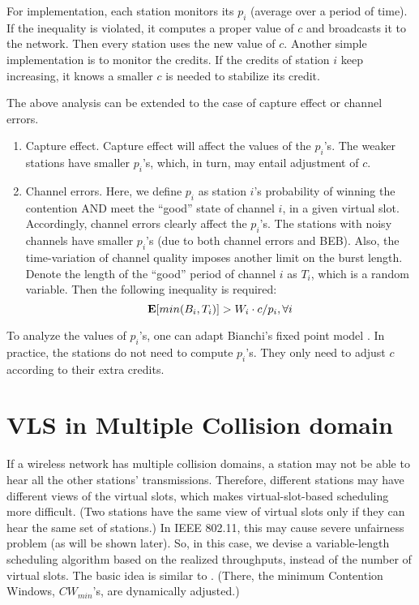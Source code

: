 \documentclass[letterpaper, 10 pt, conference]{ieeeconf}
\begin{document}
For implementation, each station monitors its $p_{i}$ (average
over a period of time). If the inequality is violated, it computes
a proper value of $c$ and broadcasts it to the network. Then every station
uses the new value of $c$. Another simple implementation
is to monitor the credits. If the credits of station $i$ keep increasing,
it knows a smaller $c$ is needed to stabilize its credit.

The above analysis can be extended to the case of capture effect or
channel errors.

\begin{enumerate}
\item Capture effect. Capture effect will affect the values of the $p_{i}$'s. The weaker
stations have smaller $p_{i}$'s, which, in turn, may entail adjustment
of $c$.
\item Channel errors. Here, we define $p_{i}$ as station $i$'s probability
of winning the contention AND meet the {}``good'' state of channel
$i$, in a given virtual slot. Accordingly, channel errors clearly affect the $p_{i}$'s.
The stations with noisy channels have smaller $p_{i}$'s (due to both
channel errors and BEB). Also, the time-variation of channel quality
imposes another limit on the burst length. Denote the length of the
{}``good'' period of channel $i$ as $T_{i}$, which is a random
variable. Then the following inequality is required:\begin{equation}
{\bf E}[min(B_{i},T_{i})]>W_{i}\cdot c/p_{i},\forall i\label{eq:stability with channel errors}\end{equation}

\end{enumerate}
To analyze the values of $p_{i}$'s, one can adapt Bianchi's fixed
point model \cite{Bianchi}. In practice, the stations do not need
to compute $p_{i}$'s. They only need to adjust $c$ according to
their extra credits.





\section{\label{sec:VLS-in-Multiple-CD}VLS in Multiple Collision domain}

If a wireless network has multiple collision domains, a station may
not be able to hear all the other stations' transmissions. Therefore,
different stations may have different views of the virtual slots, 
which makes virtual-slot-based scheduling more difficult. (Two
stations have the same view of virtual slots only if they can hear
the same set of stations.) In IEEE 802.11, this may cause severe unfairness problem 
(as will be shown later). So, in this case, we devise a variable-length
scheduling algorithm based on the realized throughputs, instead of
the number of virtual slots. The basic idea is similar to \cite{fair_by_observation}\cite{Gupta_fairness}.
(There, the minimum Contention Windows, $CW_{min}$'s, are dynamically adjusted.)
\end{document}
